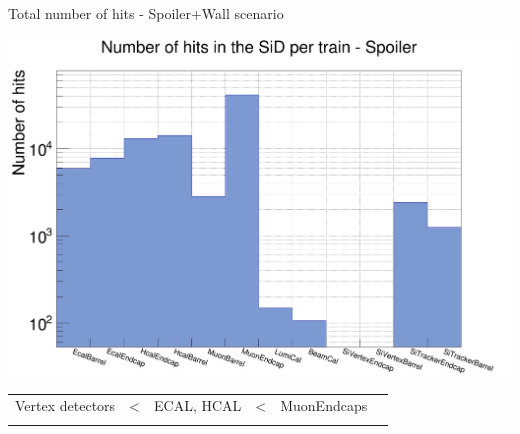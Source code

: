 \documentclass[xcolor={dvipsnames}]{beamer}
\begin{document}
\begin{frame}{Total number of hits - Spoiler+Wall scenario}
 \begin{center}
\includegraphics[height=0.65\textheight]{Number_Hits_per_Subdetector.pdf}\\
\begin{tabular}{@{}p{}p{}p{}p{}p{}p{}@{}}
 \centering Vertex detectors & < & \centering ECAL, HCAL & < & \centering MuonEndcaps & \\
  \centering{\scriptsize Smallest effective detector area} & &  \centering{\scriptsize Particle showers} & &  \centering{\scriptsize Biggest effective detector area}&
\end{tabular}
\end{center}
\end{frame}
\end{document}
